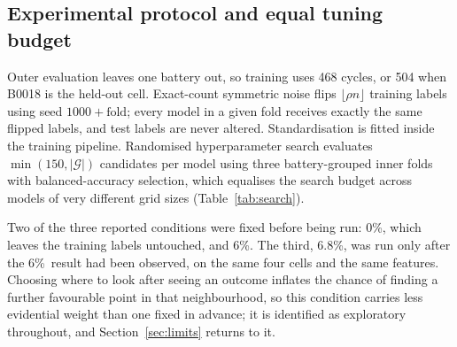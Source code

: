 \documentclass[final,5p,times,twocolumn]{elsarticle}
\newcommand{\nz}{\%}
\begin{document}
\subsection{Experimental protocol and equal tuning budget}\label{sec:protocol}
Outer evaluation leaves one battery out, so training uses 468 cycles, or 504 when B0018 is the held-out cell. Exact-count symmetric noise flips $\lfloor\rho n\rfloor$ training labels using seed $1000+\text{fold}$; every model in a given fold receives exactly the same flipped labels, and test labels are never altered. Standardisation is fitted inside the training pipeline. Randomised hyperparameter search evaluates $\min(150,|\mathcal{G}|)$ candidates per model using three battery-grouped inner folds with balanced-accuracy selection, which equalises the search budget across models of very different grid sizes (Table~\ref{tab:search}).

Two of the three reported conditions were fixed before being run: 0\nz, which leaves the training labels untouched, and 6\nz. The third, 6.8\nz, was run only after the 6\nz\ result had been observed, on the same four cells and the same features. Choosing where to look after seeing an outcome inflates the chance of finding a further favourable point in that neighbourhood, so this condition carries less evidential weight than one fixed in advance; it is identified as exploratory throughout, and Section~\ref{sec:limits} returns to it.
\end{document}

